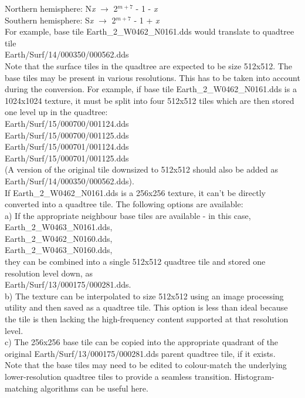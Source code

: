 \documentclass[Orbiter Developer Manual.tex]{subfiles}
\begin{document}
\indent Northern hemisphere: N\textit{x} $\rightarrow$ 2$^{m+7}$ - 1 - \textit{x}\\
\indent Southern hemisphere: S\textit{x} $\rightarrow$ 2$^{m+7}$ - 1 + \textit{x}\\
For example, base tile Earth\_2\_W0462\_N0161.dds would translate to quadtree tile\\
\indent Earth/Surf/14/000350/000562.dds\\
Note that the surface tiles in the quadtree are expected to be size 512x512. The base tiles may be present in various resolutions. This has to be taken into account during the conversion. For example, if base tile Earth\_2\_W0462\_N0161.dds is a 1024x1024 texture, it must be split into four 512x512 tiles which are then stored one level up in the quadtree:\\
\indent Earth/Surf/15/000700/001124.dds\\
\indent Earth/Surf/15/000700/001125.dds\\
\indent Earth/Surf/15/000701/001124.dds\\
\indent Earth/Surf/15/000701/001125.dds\\
(A version of the original tile downsized to 512x512 should also be added as Earth/Surf/14/000350/000562.dds).\\
If Earth\_2\_W0462\_N0161.dds is a 256x256 texture, it can't be directly converted into a quadtree tile. The following options are available:\\
a) If the appropriate neighbour base tiles are available - in this case,\\
\indent Earth\_2\_W0463\_N0161.dds,\\
\indent Earth\_2\_W0462\_N0160.dds,\\
\indent Earth\_2\_W0463\_N0160.dds,\\
they can be combined into a single 512x512 quadtree tile and stored one resolution level down, as\\
\indent Earth/Surf/13/000175/000281.dds.\\
b) The texture can be interpolated to size 512x512 using an image processing utility and then saved as a quadtree tile. This option is less than ideal because the tile is then lacking the high-frequency content supported at that resolution level.\\
c) The 256x256 base tile can be copied into the appropriate quadrant of the original Earth/Surf/13/000175/000281.dds parent quadtree tile, if it exists.\\
Note that the base tiles may need to be edited to colour-match the underlying lower-resolution quadtree tiles to provide a seamless transition. Histogram-matching algorithms can be useful here.
\end{document}
